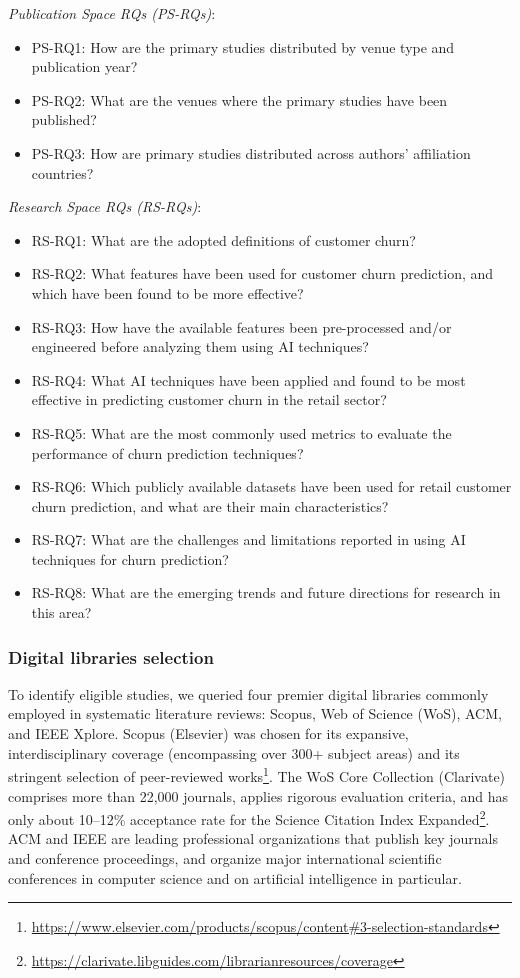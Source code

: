 \documentclass[preprint,12pt]{elsarticle}
\newcommand{\PSRQone}{PS-RQ1: How are the primary studies distributed by venue type and publication year?}
\newcommand{\PSRQtwo}{PS-RQ2: What are the venues where the primary studies have been published?}
\newcommand{\PSRQthree}{PS-RQ3: How are primary studies distributed across authors’ affiliation countries?}
\newcommand{\RSRQone}{RS-RQ1: What are the adopted definitions of customer churn?}
\newcommand{\RSRQtwo}{RS-RQ2: What features have been used for customer churn prediction, and which have been found to be more effective?}
\newcommand{\RSRQthree}{RS-RQ3: How have the available features been pre-processed and/or engineered before analyzing them using AI techniques?}
\newcommand{\RSRQfour}{RS-RQ4: What AI techniques have been applied and found to be most effective in predicting customer churn in the retail sector?}
\newcommand{\RSRQfive}{RS-RQ5: What are the most commonly used metrics to evaluate the performance of churn prediction techniques?}
\newcommand{\RSRQsix}{RS-RQ6: Which publicly available datasets have been used for retail customer churn prediction, and what are their main characteristics?}
\newcommand{\RSRQseven}{RS-RQ7: What are the challenges and limitations reported in using AI techniques for churn prediction?}
\newcommand{\RSRQeight}{RS-RQ8: What are the emerging trends and future directions for research in this area?}
\begin{document}
\textit{Publication Space RQs (PS-RQs)}:
\begin{itemize}[label={}, itemsep=1pt, parsep=0pt, topsep=0pt]
    \item \PSRQone
    \item \PSRQtwo
    \item \PSRQthree
\end{itemize}

\textit{Research Space RQs (RS-RQs)}:
\begin{itemize}[label={}, itemsep=1pt, parsep=0pt, topsep=0pt]
    \item \RSRQone
    \item \RSRQtwo
    \item \RSRQthree
    \item \RSRQfour
    \item \RSRQfive
    \item \RSRQsix
    \item \RSRQseven
    \item \RSRQeight
\end{itemize}

\subsubsection{Digital libraries selection} 
To identify eligible studies, we queried four premier digital libraries commonly employed in systematic literature reviews: Scopus, Web of Science (WoS), ACM, and IEEE Xplore. Scopus (Elsevier) was chosen for its expansive, interdisciplinary coverage (encompassing over 300+ subject areas) and its stringent selection of peer-reviewed works\footnote{\url{https://www.elsevier.com/products/scopus/content\#3-selection-standards}}. The WoS Core Collection (Clarivate) comprises more than 22,000 journals, applies rigorous evaluation criteria, and has only about 10–12\% acceptance rate for the Science Citation Index Expanded\footnote{\url{https://clarivate.libguides.com/librarianresources/coverage}}. ACM and IEEE are leading professional organizations that publish key journals and conference proceedings, and organize major international scientific conferences in computer science and on artificial intelligence in particular.
\end{document}
